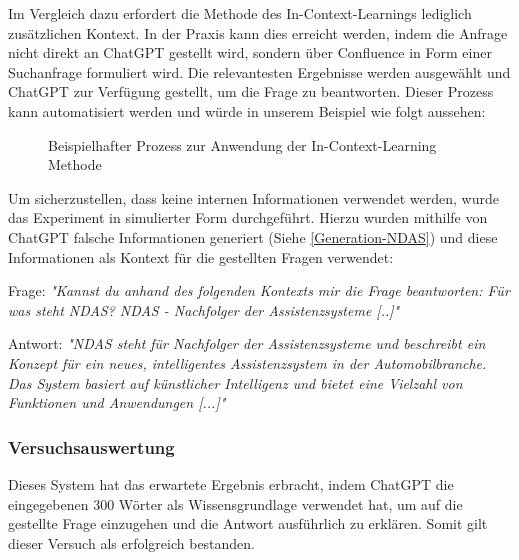 Im Vergleich dazu erfordert die Methode des In-Context-Learnings lediglich zusätzlichen Kontext. In der Praxis kann dies erreicht werden, indem die Anfrage nicht direkt an ChatGPT gestellt wird, sondern über Confluence in Form einer Suchanfrage formuliert wird. Die relevantesten Ergebnisse werden ausgewählt und ChatGPT zur Verfügung gestellt, um die Frage zu beantworten. Dieser Prozess kann automatisiert werden und würde in unserem Beispiel wie folgt aussehen: 

\begin{figure}[H]
\centering
{}
\caption{Beispielhafter Prozess zur Anwendung der In-Context-Learning Methode}
\label{fig:In-context_lerning}
\end{figure}

Um sicherzustellen, dass keine internen Informationen verwendet werden, wurde das Experiment in simulierter Form durchgeführt. Hierzu wurden mithilfe von ChatGPT falsche Informationen generiert (Siehe \autoref{Generation-NDAS}) und diese Informationen als Kontext für die gestellten Fragen verwendet:

Frage: \emph{"Kannst du anhand des folgenden Kontexts mir die Frage beantworten: Für was steht NDAS?
NDAS - Nachfolger der Assistenzsysteme [..]" }

Antwort: \emph{"NDAS steht für Nachfolger der Assistenzsysteme und beschreibt ein Konzept für ein neues, intelligentes Assistenzsystem in der Automobilbranche. Das System basiert auf künstlicher Intelligenz und bietet eine Vielzahl von Funktionen und Anwendungen [...]" }

\subsubsection{Versuchsauswertung}
 Dieses System hat das erwartete Ergebnis erbracht, indem ChatGPT die eingegebenen 300 Wörter als Wissensgrundlage verwendet hat, um auf die gestellte Frage einzugehen und die Antwort ausführlich zu erklären. Somit gilt dieser Versuch als erfolgreich bestanden.

